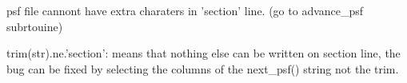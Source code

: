 
\begin{DoxyRefList}
\item[\label{bug__bug000001}%
\hypertarget{bug__bug000001}{}%
Type \hyperlink{classmolreader}{molreader} ]psf file cannont have extra charaters in 'section' line. (go to advance\-\_\-psf subrtouine)  
\item[\label{bug__bug000002}%
\hypertarget{bug__bug000002}{}%
Subprogram \hyperlink{classmolreader_a7a4cb6436916cd4b8ee0341d528e9c73}{molreader\-:\-:advance\-\_\-psf} (section, nrecord)]trim(str).ne.'section'\-: means that nothing else can be written on section line, the bug can be fixed by selecting the columns of the next\-\_\-psf() string not the trim. 
\end{DoxyRefList}